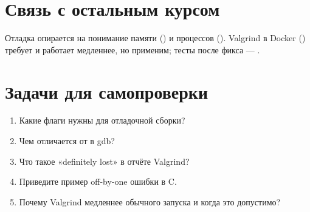 \section{Связь с остальным курсом}

Отладка опирается на понимание памяти
() и процессов
(). Valgrind в Docker
() требует
 и работает медленнее, но применим;
тесты после фикса --- .

\section{Задачи для самопроверки}
\begin{enumerate}
  \item Какие флаги  нужны для отладочной
    сборки?
  \item Чем  отличается от  в gdb?
  \item Что такое «definitely lost» в отчёте Valgrind?
  \item Приведите пример off-by-one ошибки в C.
  \item Почему Valgrind медленнее обычного запуска и
    когда это допустимо?
\end{enumerate}
